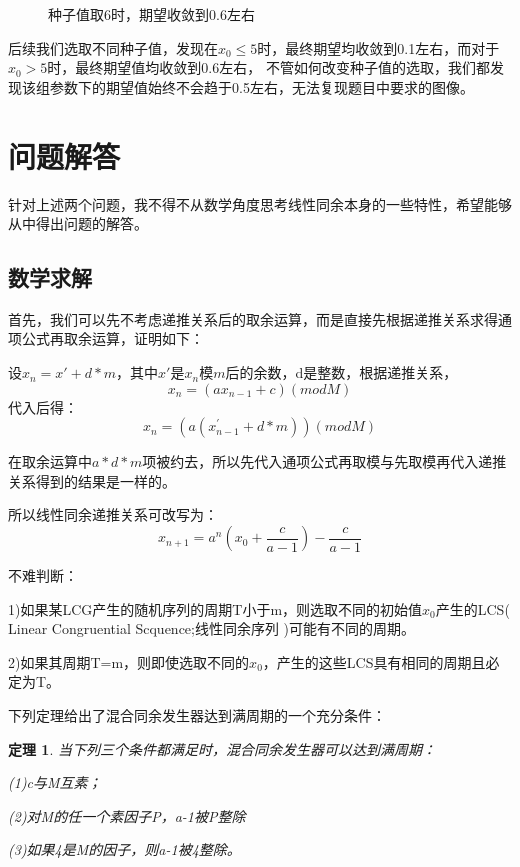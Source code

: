 \documentclass[12pt,a4paper]{article}%
\newtheorem{theorem}{\indent 定理}[section]
\begin{document}
\begin{figure}[H]
\begin{minipage}{0.48\textwidth}
            \caption{\fontsize{10pt}{15pt}\selectfont 种子值取6时，期望收敛到0.6左右}
        \end{minipage}\label{fig:figure3}
    \end{figure}

    后续我们选取不同种子值，发现在$x_0\leq 5$时，最终期望均收敛到0.1左右，而对于$x_0 > 5$时，最终期望值均收敛到0.6左右，
    不管如何改变种子值的选取，我们都发现该组参数下的期望值始终不会趋于0.5左右，无法复现题目中要求的图像。


    \section{问题解答}
    针对上述两个问题，我不得不从数学角度思考线性同余本身的一些特性，希望能够从中得出问题的解答。

    \subsection{数学求解}
    首先，我们可以先不考虑递推关系后的取余运算，而是直接先根据递推关系求得通项公式再取余运算，证明如下：

    设$x_n=x'+d*m$，其中$x'$是$x_n$模$m$后的余数，d是整数，根据递推关系，
    \[x_n = (ax_{n-1}+c)    (mod M) \]
    代入后得：
    \[x_n = (a(x_{n-1}^{'}+d*m))(mod M)\]

    在取余运算中$a*d*m$项被约去，所以先代入通项公式再取模与先取模再代入递推关系得到的结果是一样的。

    所以线性同余递推关系可改写为：
    \begin{equation}
        x_{n+1}=a^n(x_0+\frac{c}{a-1})-\frac{c}{a-1}
    \end{equation}

    不难判断：


    1)如果某LCG产生的随机序列的周期T小于m，则选取不同的初始值$x_0$产生的LCS(
    Linear Congruential Scquence;线性同余序列
    )可能有不同的周期。

    2)如果其周期T=m，则即使选取不同的$x_0$，产生的这些LCS具有相同的周期且必定为T。


    下列定理给出了混合同余发生器达到满周期的一个充分条件：
    \begin{theorem}
        当下列三个条件都满足时，混合同余发生器可以达到满周期：

        \hspace{2cm}(1)c与M互素；

        \hspace{2cm}(2)对M的任一个素因子P，a-1被P整除

        \hspace{2cm}(3)如果4是M的因子，则a-1被4整除。
    \end{theorem}
\end{document}
